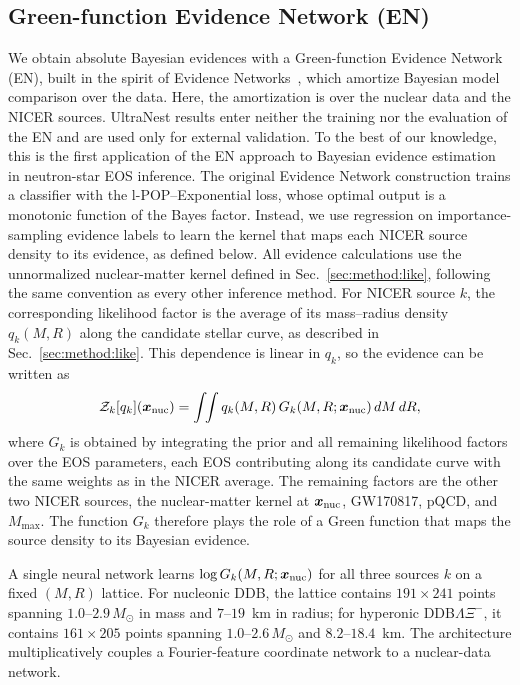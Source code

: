 \documentclass[aps,prd,twocolumn,superscriptaddress,nofootinbib,longbibliography]{revtex4-2}
\newcommand{\msun}{\ensuremath{M_\odot}}
\begin{document}
\subsection{Green-function Evidence Network (EN)}
\label{sec:method:en}

We obtain absolute Bayesian evidences with a
Green-function Evidence Network (EN), built in the spirit of Evidence
Networks~\cite{Jeffrey:2023stk}, which amortize Bayesian model comparison over
the data. Here, the amortization is over the nuclear data and the NICER
sources. UltraNest results enter neither the training nor the evaluation of
the EN and are used only for external validation. To the best of our
knowledge, this is the first application of the EN approach to Bayesian
evidence estimation in neutron-star EOS inference. The original Evidence
Network construction trains a classifier with the l-POP--Exponential loss,
whose optimal output is a monotonic function of the Bayes factor. Instead, we
use regression on importance-sampling evidence labels to learn the kernel that maps each
NICER source density to its evidence, as defined below.
All evidence calculations use the unnormalized nuclear-matter
kernel defined in Sec.~\ref{sec:method:like}, following the same convention as
every other inference method. For NICER source $k$, the corresponding
likelihood factor is the average of its mass--radius density $q_k(M,R)$ along
the candidate stellar curve, as described in Sec.~\ref{sec:method:like}. This
dependence is linear in $q_k$, so the evidence can be written as
\begin{equation}
\mathcal Z_k[q_k](\bm x_{\rm nuc})=\int\!\!\int
q_k(M,R)\,G_k(M,R;\bm x_{\rm nuc})\,dM\,dR,
\label{eq:en-green}
\end{equation}
where $G_k$ is obtained by integrating the prior and all remaining likelihood
factors over the EOS parameters, each EOS contributing along its candidate
curve with the same weights as in the NICER average. The remaining factors are
the other two NICER sources, the nuclear-matter kernel at $\bm x_{\rm nuc}$,
GW170817, pQCD, and $M_{\max}$. The function $G_k$ therefore plays the role of
a Green function that maps the source density to its Bayesian evidence.

A single neural network learns $\log G_k(M,R;\bm x_{\rm nuc})$ for
all three sources $k$ on a fixed $(M,R)$ lattice. For nucleonic DDB, the
lattice contains $191\times241$ points spanning $1.0$--$2.9\,\msun$ in mass
and $7$--$19$~km in radius; for hyperonic DDB$\Lambda\Xi^-$, it contains
$161\times205$ points spanning $1.0$--$2.6\,\msun$ and $8.2$--$18.4$~km.
The architecture multiplicatively couples a Fourier-feature coordinate
network to a nuclear-data network.
\end{document}
